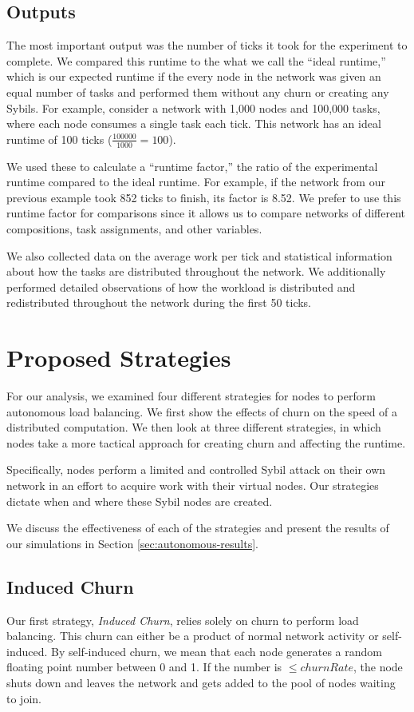 \documentclass[11pt,conference]{IEEEtran}
\begin{document}
\subsection{Outputs}
The most important output was the number of ticks it took for the experiment to complete.
We compared this runtime to the what we call the ``ideal runtime,'' which is our expected runtime if the every node in the network was given an equal number of tasks and performed them without any churn or creating any Sybils.
For example, consider a network with 1,000 nodes and 100,000 tasks, where each node consumes a single task each tick. 
This network has an ideal runtime of 100 ticks ($ \frac{100000}{1000} = 100$).

We used these to calculate a ``runtime factor,'' the ratio of the experimental runtime compared to the ideal runtime.
For example, if the network from our previous example took 852 ticks to finish, its factor is 8.52.
We prefer to use this runtime factor for comparisons since it allows us to compare networks of different compositions, task assignments, and other variables.

We also collected data on the average work per tick and statistical information about how the tasks are distributed throughout the network.
We additionally performed detailed observations of how the workload is  distributed and redistributed throughout the network during the first 50 ticks.

\section{Proposed Strategies}
\label{sec:strategies}

For our analysis, we examined four different strategies for nodes to perform autonomous load balancing.
We first show the effects of churn on the speed of a distributed computation.
We then look at three different strategies, in which nodes take a more tactical approach for creating churn and affecting the runtime.

Specifically, nodes perform a limited and controlled Sybil attack \cite{sybil} on their own network in an effort to acquire work with their virtual nodes.
Our strategies dictate when and where these Sybil nodes are created.

We discuss the effectiveness of each of the strategies and present the results of our simulations in Section \ref{sec:autonomous-results}.



\subsection{Induced Churn}
\label{sec:strat-churn}
Our first strategy, \textit{Induced Churn}, relies solely on churn to perform load balancing.
This churn can either be a product of normal network activity or self-induced.
By self-induced churn, we mean that each node generates a random floating point number between 0 and 1.
If the number is $\leq churnRate$, the node shuts down and leaves the network and gets added to the pool of nodes waiting to join.
\end{document}
